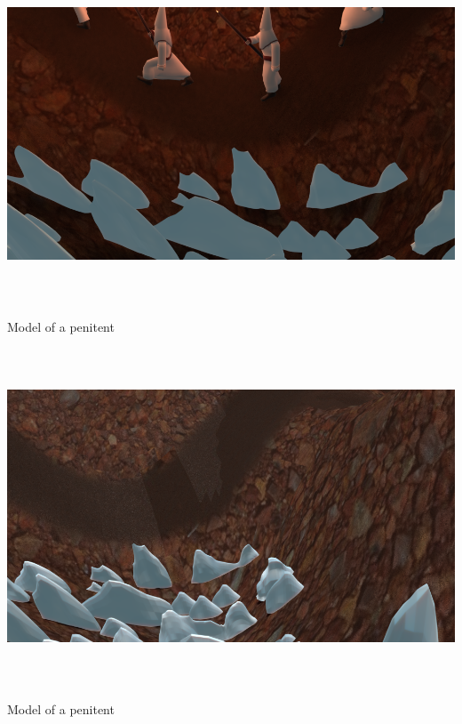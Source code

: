 \documentclass[12pt,a4paper,titlepage,final,tikz,border=4mm]{report}
\begin{document}
\begin {center}
\includegraphics [height = 10cm] {PenitenteAndPenitentes.png}
\caption {Model of a penitent}
\end {center}
\begin {center}
\includegraphics [height = 10cm] {Penitentes.png}
\caption {Model of a penitent}
\end {center}

 


\end{document}
